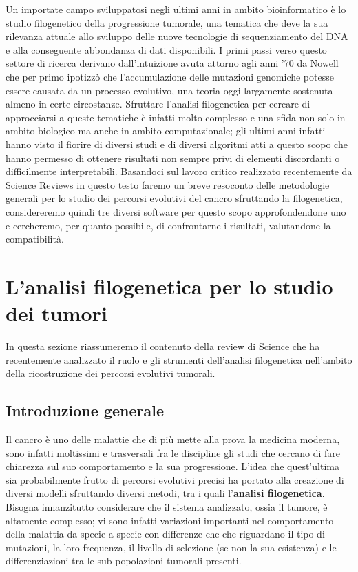 \documentclass[a4paper]{article}
\begin{document}
	 Un importate campo sviluppatosi negli ultimi anni in ambito bioinformatico è lo studio filogenetico della progressione tumorale, una tematica che deve la sua rilevanza attuale
	 allo sviluppo delle nuove tecnologie di sequenziamento del DNA e alla conseguente abbondanza di dati disponibili.
	 I primi passi verso questo settore di ricerca derivano dall'intuizione avuta attorno 
	 agli anni '70 da Nowell \cite{Nowell} che per primo ipotizzò che l'accumulazione delle mutazioni genomiche potesse essere
	 causata da un processo evolutivo, una teoria oggi largamente sostenuta almeno in certe circostanze.
	 Sfruttare l'analisi filogenetica per cercare di approcciarsi a queste tematiche è infatti molto complesso e una sfida non solo in ambito biologico ma anche in ambito computazionale; 
	 gli ultimi anni infatti hanno visto il fiorire di diversi studi e di diversi algoritmi atti a questo scopo che hanno permesso di ottenere risultati non sempre privi di elementi discordanti o difficilmente interpretabili.
	 Basandoci sul lavoro critico realizzato recentemente da Science Reviews \cite{Review} in questo testo faremo un breve resoconto delle metodologie generali per lo studio dei percorsi evolutivi del cancro sfruttando 
	 la filogenetica, considereremo quindi tre diversi software per questo scopo approfondendone uno \cite{BMLPub} e cercheremo, per quanto possibile, di confrontarne i risultati, valutandone la compatibilità. 

	\newpage	


	\section{\LARGE L'analisi filogenetica per lo studio dei tumori}
	
	In questa sezione riassumeremo il contenuto della review di Science che ha recentemente analizzato il ruolo e gli strumenti dell'analisi filogenetica 
	nell'ambito della ricostruzione dei percorsi evolutivi tumorali.

	\subsection{\large Introduzione generale}

	Il cancro è uno delle malattie che di più mette alla prova la medicina moderna, sono infatti moltissimi e trasversali fra le discipline gli 
	studi che cercano di fare chiarezza sul suo comportamento e la sua progressione.
	L'idea che quest'ultima sia probabilmente frutto di percorsi
	evolutivi precisi ha portato alla creazione di diversi modelli sfruttando diversi metodi, tra i quali l'\textbf{analisi filogenetica}.
	Bisogna innanzitutto considerare che il sistema analizzato, ossia il tumore, è altamente complesso;
	vi sono infatti variazioni importanti nel comportamento della malattia da specie a specie con differenze che che riguardano il tipo di mutazioni,
	la loro frequenza, il livello di selezione (se non la sua esistenza) e le differenziazioni tra le sub-popolazioni tumorali presenti.
	
\end{document}
